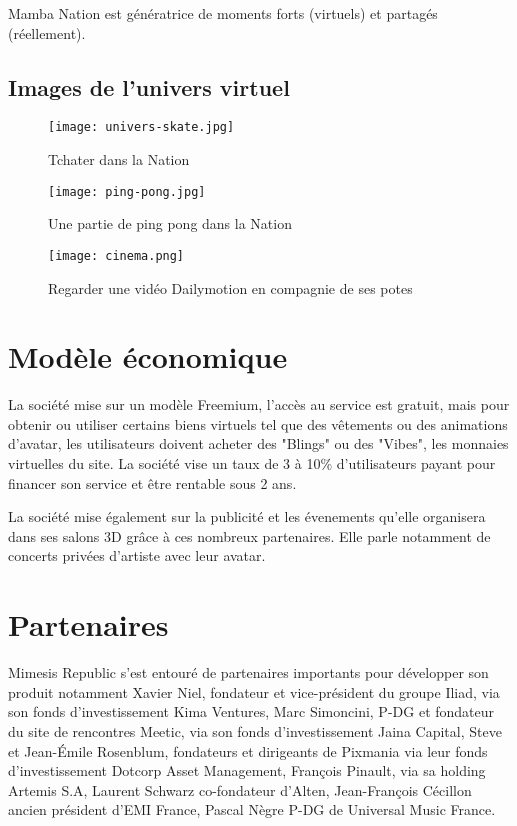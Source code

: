 Mamba Nation est génératrice de moments forts (virtuels) et partagés
(réellement).

\subsection{Images de l'univers virtuel} 

\begin{figure}[H]
  \texttt{[image: univers-skate.jpg]}
  \caption{Tchater dans la Nation}
\end{figure}

\begin{figure}[H]
  \texttt{[image: ping-pong.jpg]}
  \caption{Une partie de ping pong dans la Nation}
\end{figure}

\begin{figure}[H]
  \texttt{[image: cinema.png]}
  \caption{Regarder une vidéo Dailymotion en compagnie de ses potes}
\end{figure}

\section{Modèle économique}

La société mise sur un modèle Freemium, l'accès au service est gratuit, mais
pour obtenir ou utiliser certains biens virtuels tel que des vêtements ou des
animations d'avatar, les utilisateurs doivent acheter des "Blings" ou des
"Vibes", les monnaies virtuelles du site. La société vise un taux de 3 à 10\%
d'utilisateurs payant pour financer son service et être rentable sous 2 ans.

La société mise également sur la publicité et les évenements qu'elle organisera
dans ses salons 3D grâce à ces nombreux partenaires. Elle parle notamment de
concerts privées d'artiste avec leur avatar.

\section{Partenaires}

Mimesis Republic s'est entouré de partenaires importants pour développer son
produit notamment Xavier Niel, fondateur et vice-président du groupe Iliad, via
son fonds d’investissement Kima Ventures, Marc Simoncini, P-DG et fondateur du
site de rencontres Meetic, via son fonds d'investissement Jaina Capital, Steve
et Jean-Émile Rosenblum, fondateurs et dirigeants de Pixmania via leur fonds
d'investissement Dotcorp Asset Management, François Pinault, via sa holding
Artemis S.A, Laurent Schwarz co-fondateur d'Alten, Jean-François Cécillon ancien
président d'EMI France, Pascal Nègre P-DG de Universal Music France.


